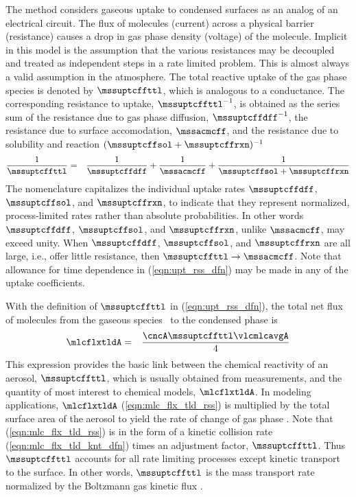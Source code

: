 \documentclass[12pt,twoside]{book}
\newcounter{reaction} %
\begin{document}
The  method considers gaseous uptake to
condensed surfaces as an analog of an electrical circuit.
The flux of molecules (current) across a physical barrier (resistance)
causes a drop in gas phase density (voltage) of the molecule.  
Implicit in this model is the assumption that the various resistances
may be decoupled and treated as independent steps in a rate limited
problem. 
This is almost always a valid assumption in the atmosphere.
The total reactive uptake of the gas phase species is denoted by
$\mssuptcffttl$, which is analogous to a conductance.
The corresponding resistance to uptake, $\mssuptcffttl^{-1}$, is
obtained as the series sum of the resistance due to gas phase
diffusion, $\mssuptcffdff^{-1}$, the resistance due to surface
accomodation, $\mssacmcff$, and the resistance due to solubility and
reaction $(\mssuptcffsol + \mssuptcffrxn)^{-1}$ 
\begin{eqnarray}
\frac{1}{\mssuptcffttl } & = & \frac{1}{\mssuptcffdff }
+ \frac{1}{\mssacmcff } + \frac{1}{\mssuptcffsol + \mssuptcffrxn }
\label{eqn:upt_rss_dfn}
\end{eqnarray}
The nomenclature capitalizes the individual uptake rates
$\mssuptcffdff$, $\mssuptcffsol$, and $\mssuptcffrxn$, to indicate
that they represent normalized, process-limited rates rather than
absolute probabilities. 
In other words $\mssuptcffdff$, $\mssuptcffsol$, and $\mssuptcffrxn$, 
unlike $\mssacmcff$, may exceed unity.
When $\mssuptcffdff$, $\mssuptcffsol$, and $\mssuptcffrxn$ are all
large, i.e., offer little resistance, then 
$\mssuptcffttl \rightarrow \mssacmcff$. 
Note that allowance for time dependence in (\ref{eqn:upt_rss_dfn}) may
be made in any of the uptake coefficients. 

With the definition of $\mssuptcffttl$ in (\ref{eqn:upt_rss_dfn}), the
total net flux of molecules from the gaseous species \A\ to the
condensed phase is 
\begin{eqnarray}
\mlcflxtldA & = & \frac{\cncA \mssuptcffttl \vlcmlcavgA}{4}
\label{eqn:mlc_flx_tld_rss}
\end{eqnarray}
This expression provides the basic link between the chemical
reactivity of an aerosol, $\mssuptcffttl$, which is usually obtained
from measurements, and the quantity of most interest to chemical
models, $\mlcflxtldA$.  
In modeling applications, $\mlcflxtldA$ (\ref{eqn:mlc_flx_tld_rss}) is
multiplied by the total surface area of the aerosol to yield the rate
of change of gas phase \A.
Note that (\ref{eqn:mlc_flx_tld_rss}) is in the form of a kinetic
collision rate (\ref{eqn:mlc_flx_tld_knt_dfn}) times an adjustment
factor, $\mssuptcffttl$.
Thus $\mssuptcffttl$ accounts for all rate limiting processes except
kinetic transport to the surface.
In other words, $\mssuptcffttl$ is the mass transport rate normalized
by the Boltzmann gas kinetic flux \cite[]{KWZ95}.
\end{document}
